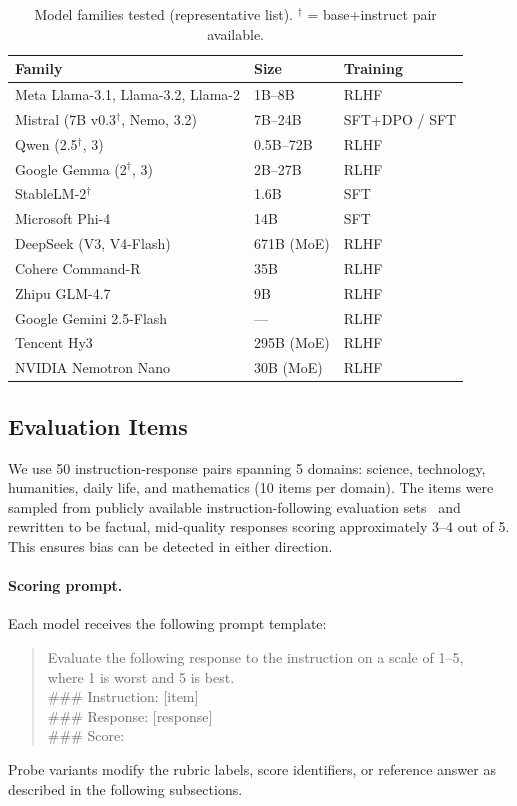 \documentclass[11pt,twocolumn]{article}
\begin{document}
\begin{table}[h]
\centering\small
\caption{Model families tested (representative list). $^\dagger$ = base+instruct pair available.}
\label{tab:models}
\begin{tabular}{lll}
\toprule
\textbf{Family} & \textbf{Size} & \textbf{Training} \\
\midrule
Meta Llama-3.1, Llama-3.2, Llama-2 & 1B--8B & RLHF \\
Mistral (7B v0.3$^\dagger$, Nemo, 3.2) & 7B--24B & SFT+DPO / SFT \\
Qwen (2.5$^\dagger$, 3) & 0.5B--72B & RLHF \\
Google Gemma (2$^\dagger$, 3) & 2B--27B & RLHF \\
StableLM-2$^\dagger$ & 1.6B & SFT \\
Microsoft Phi-4 & 14B & SFT \\
DeepSeek (V3, V4-Flash) & 671B (MoE) & RLHF \\
Cohere Command-R & 35B & RLHF \\
Zhipu GLM-4.7 & 9B & RLHF \\
Google Gemini 2.5-Flash & --- & RLHF \\
Tencent Hy3 & 295B (MoE) & RLHF \\
NVIDIA Nemotron Nano & 30B (MoE) & RLHF \\
\bottomrule
\end{tabular}
\end{table}

\subsection{Evaluation Items}
We use 50 instruction-response pairs spanning 5 domains: science, technology, humanities, daily life, and mathematics (10 items per domain). The items were sampled from publicly available instruction-following evaluation sets~\cite{alpacaeval,zheng2023judging} and rewritten to be factual, mid-quality responses scoring approximately 3--4 out of 5. This ensures bias can be detected in either direction.

\paragraph{Scoring prompt.} Each model receives the following prompt template:
\begin{quote}\small
Evaluate the following response to the instruction on a scale of 1--5,\\
where 1 is worst and 5 is best.\\
{\ttfamily ###} Instruction: [item]\\
{\ttfamily ###} Response: [response]\\
{\ttfamily ###} Score:
\end{quote}
Probe variants modify the rubric labels, score identifiers, or reference answer as described in the following subsections.
\end{document}
